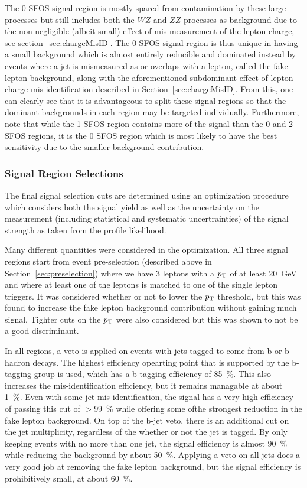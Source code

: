 The 0 SFOS signal region is mostly spared from contamination  by 
these large processes but still
includes both the $WZ$ and $ZZ$ processes as background due to the
non-negligible (albeit small) effect of mis-measurement of the lepton
charge, see section~\ref{sec:chargeMisID}.  The 0 SFOS signal region
is thus unique in having a small background which is almost entirely
reducible and dominated instead by events where a jet is mismeasured
as or overlaps with a lepton, called the fake lepton background, along
with the aforementioned subdominant effect of lepton charge 
mis-identification described in Section~\ref{sec:chargeMisID}.  
From this, one can clearly see that it is
advantageous to split these signal regions so that the dominant
backgrounds in each region may be targeted individually.  Furthermore,
note that while the 1 SFOS region contains more of the signal than the
0 and 2 SFOS regions, it is the 0 SFOS region which is most likely to
have the best sensitivity due to the smaller background contribution.

\subsubsection{Signal Region Selections}

The final signal selection cuts are determined using an optimization
procedure which considers both the signal yield as well as the uncertainty
on the measurement (including statistical and systematic uncertrainties)
of the signal strength as taken from the profile likelihood. 

Many different quantities were considered in the optimization.  All three signal 
regions start from event pre-selection (described above in Section~\ref{sec:preselection}) where 
we have 3 leptons with a $p_{\mathrm{T}}$ of at least 20~GeV 
and where at least one of the leptons is matched to one of the single lepton triggers.
It was considered whether or not to lower the $p_{\mathrm{T}}$ threshold, but this was found to increase
the fake lepton background contribution without gaining much signal. Tighter cuts on the $p_{\mathrm{T}}$
were also considered but this was shown to not be a good discriminant. 

In all regions, 
a veto is applied on events with jets tagged to come from b or b-hadron decays. The highest
efficiency opearting point that is supported by the b-tagging group is used,
which has a b-tagging efficiency of 85~\%.  This also increases the mis-identification efficiency, 
but it remains managable at about 1~\%. Even with some jet mis-identification, the signal has
a very high efficiency of passing this cut of $> 99$~\% while offering some ofthe strongest 
reduction in the fake lepton background. On top of the b-jet veto, there is an additional
cut on the jet multiplicity, regardless of the whether or not the jet is tagged. By only keeping
events with no more than one jet, the signal efficiency is almost $90$~\% while reducing
the background by about 50~\%.  Applying a veto on all jets does a very good job at removing the fake lepton
background, but the signal efficiency is prohibitively small, at about 60~\%. 

